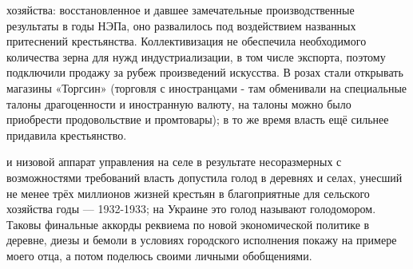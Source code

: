 \label{120-1}
хозяйства: восстановленное и давшее замечательные производственные результаты в годы НЭПа, оно развалилось под воздействием названных притеснений крестьянства. Коллективизация не обеспечила необходимого количества зерна для нужд индустриализации, в том числе экспорта, поэтому подключили продажу за рубеж произведений искусства. В розах стали открывать магазины «Торгсин» (торговля с иностранцами - там обменивали на специальные талоны драгоценности и иностранную валюту, на талоны можно было приобрести продовольствие и промтовары); в то же время власть ещё сильнее придавила крестьянство.

\label{121-1}
и низовой аппарат управления на селе в результате несоразмерных с возможностями требований власть допустила голод в деревнях и селах, унесший не менее трёх миллионов жизней крестьян в благоприятные для сельского хозяйства годы — 1932-1933; на Украине это голод называют голодомором. Таковы финальные аккорды реквиема по новой экономической политике в деревне, диезы и бемоли в условиях городского исполнения покажу на примере моего отца, а потом поделюсь своими личными обобщениями.